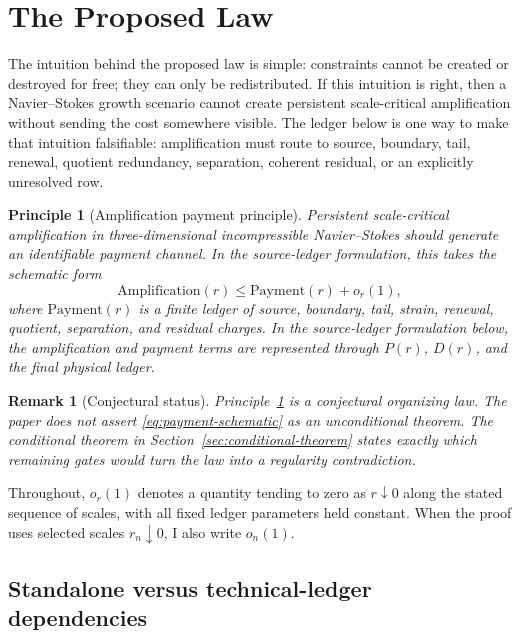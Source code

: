 \documentclass[11pt]{article}
\newtheorem{principle}{Principle}
\newtheorem{remark}{Remark}
\begin{document}
\clearpage
\section{The Proposed Law}
\label{sec:law}

The intuition behind the proposed law is simple: constraints cannot be created
or destroyed for free; they can only be redistributed.  If this intuition is
right, then a Navier--Stokes growth scenario cannot create persistent
scale-critical amplification without sending the cost somewhere visible.  The
ledger below is one way to make that intuition falsifiable: amplification must
route to source, boundary, tail, renewal, quotient redundancy, separation,
coherent residual, or an explicitly unresolved row.

\begin{principle}[Amplification payment principle]
\label{prin:payment}
Persistent scale-critical amplification in three-dimensional incompressible
Navier--Stokes should generate an identifiable payment channel.  In the
source-ledger formulation, this takes the schematic form
\begin{equation}
\label{eq:payment-schematic}
\mathrm{Amplification}(r)\le \mathrm{Payment}(r)+o_r(1),
\end{equation}
where \(\mathrm{Payment}(r)\) is a finite ledger of source, boundary, tail,
strain, renewal, quotient, separation, and residual charges.  In the
source-ledger formulation below, the amplification and payment terms are
represented through \(P(r)\), \(D(r)\), and the final physical ledger.
\end{principle}

\begin{remark}[Conjectural status]
\label{rem:conjectural-status}
Principle~\ref{prin:payment} is a conjectural organizing law.  The paper does
not assert \eqref{eq:payment-schematic} as an unconditional theorem.  The
conditional theorem in Section~\ref{sec:conditional-theorem} states exactly
which remaining gates would turn the law into a regularity contradiction.
\end{remark}

Throughout, \(o_r(1)\) denotes a quantity tending to zero as \(r\downarrow0\)
along the stated sequence of scales, with all fixed ledger parameters held
constant.  When the proof uses selected scales \(r_n\downarrow0\), I also
write \(o_n(1)\).

\subsection*{Standalone versus technical-ledger dependencies}
\end{document}

